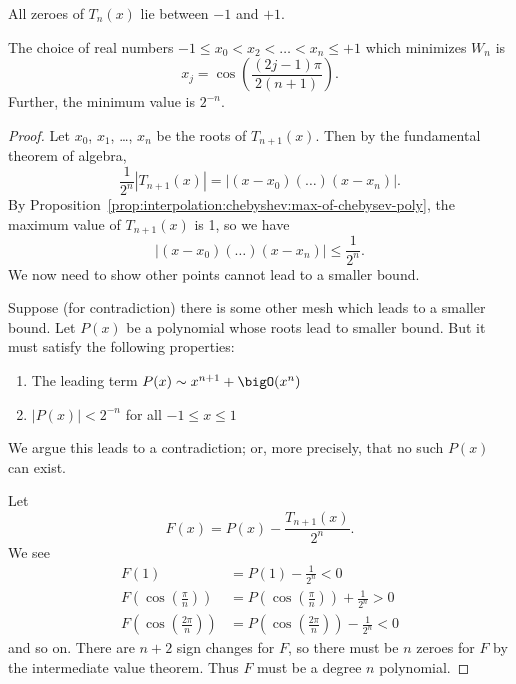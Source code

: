 \begin{prop}
  All zeroes of $T_{n}(x)$ lie between $-1$ and $+1$.
\end{prop}

\begin{thm}
The choice of real numbers $-1\leq x_{0} < x_{2} < \dots < x_{n}\leq+1$
which minimizes $W_{n}$ is
\begin{equation}
  x_{j} = \cos\left(\frac{(2j-1)\pi}{2(n+1)}\right).
\end{equation}
Further, the minimum value is $2^{-n}$.
\end{thm}
\begin{proof}
  Let $x_{0}$, $x_{1}$, \dots, $x_{n}$ be the roots of
  $T_{n+1}(x)$. Then by the fundamental theorem of algebra,
  \begin{equation}
    \frac{1}{2^{n}}|T_{n+1}(x)| = |(x-x_{0})(\dots)(x-x_{n})|.
  \end{equation}
  By Proposition~\ref{prop:interpolation:chebyshev:max-of-chebysev-poly},
  the maximum value of $T_{n+1}(x)$ is 1, so we have
  \begin{equation}
    |(x-x_{0})(\dots)(x-x_{n})|\leq\frac{1}{2^{n}}.
  \end{equation}
  We now need to show other points cannot lead to a smaller bound.

  Suppose (for contradiction) there is some other mesh which leads to a
  smaller bound.
  Let $P(x)$ be a polynomial whose roots lead to smaller bound. But it
  must satisfy the following properties:
  \begin{enumerate}
  \item The leading term $P(x)\sim x^{n+1}+\bigO(x^{n})$
  \item $|P(x)| < 2^{-n}$ for all $-1\leq x\leq 1$
  \end{enumerate}
  We argue this leads to a contradiction; or, more precisely, that no
  such $P(x)$ can exist.

  Let
  \begin{equation}
    F(x) = P(x) - \frac{T_{n+1}(x)}{2^{n}}.
  \end{equation}
  We see
  \begin{subequations}
    \begin{align}
      F(1) &= P(1) - \frac{1}{2^{n}} < 0\\
      F\left(\cos\left(\frac{\pi}{n}\right)\right)
      &= P\left(\cos\left(\frac{\pi}{n}\right)\right)
      + \frac{1}{2^{n}} > 0\\
      F\left(\cos\left(\frac{2\pi}{n}\right)\right)
      &= P\left(\cos\left(\frac{2\pi}{n}\right)\right)
      - \frac{1}{2^{n}} < 0
    \end{align}
  \end{subequations}
  and so on. There are $n+2$ sign changes for $F$, so there must be $n$
  zeroes for $F$ by the intermediate value theorem. Thus $F$ must be a
  degree $n$ polynomial.


\end{proof}
